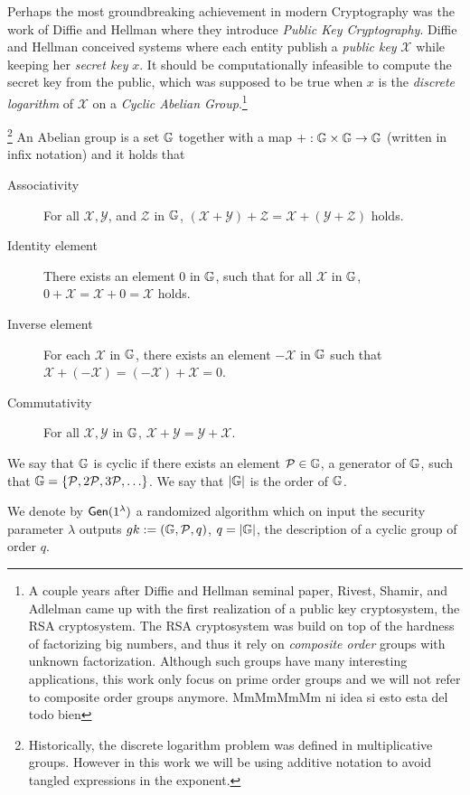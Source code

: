 Perhaps the most groundbreaking achievement in modern Cryptography was the work of Diffie and Hellman \cite{DifHel76} where they introduce \emph{Public Key Cryptography}. Diffie and Hellman conceived systems where each entity publish a \emph{public key} $\mathcal{X}$ while keeping her \emph{secret key} $x$.  It should be computationally infeasible to compute the secret key from the public, which was supposed to be true when $x$ is the \emph{discrete logarithm} of $\mathcal{X}$ on a \emph{Cyclic Abelian Group}.\footnote{A couple years after Diffie and Hellman seminal paper,  Rivest, Shamir, and Adlelman came up with the first realization of a public key cryptosystem, the RSA cryptosystem. The RSA cryptosystem was build on top of the hardness of factorizing big numbers, and thus it rely on \emph{composite order} groups with unknown factorization. Although such groups have many interesting applications, this work only focus on prime order groups and we will not refer to composite order groups anymore.{\color{red} MmMmMmMm ni idea si esto esta del todo bien}}
\begin{definition}\footnote{Historically, the discrete logarithm problem was defined in multiplicative groups. However in this work we will be using additive notation to avoid tangled expressions in the exponent.} 
An Abelian group is a set $\mathbb{G}$ together with a map $+:\mathbb{G}\times\mathbb{G}\to\mathbb{G}$ (written in infix notation) and  it holds that
\begin{description}
\item[Associativity]
For all $\mathcal{X}, \mathcal{Y}$, and $\mathcal{Z}$ in $\mathbb{G}$, $(\mathcal{X} + \mathcal{Y}) + \mathcal{Z}= \mathcal{X} + (\mathcal{Y} + \mathcal{Z})$ holds.
\item[Identity element]
There exists an element $0$ in $\mathbb{G}$, such that for all $\mathcal{X}$ in $\mathbb{G}$, $0 + \mathcal{X} = \mathcal{X} + 0 = \mathcal{X}$ holds.
\item[Inverse element]
For each $\mathcal{X}$ in $\mathbb{G}$, there exists an element $-\mathcal{X}$ in $\mathbb{G}$ such that $\mathcal{X}+ (-\mathcal{X}) = (-\mathcal{X}) +\mathcal{X} = 0$.
\item[Commutativity]
For all $\mathcal{X}, \mathcal{Y}$ in $\mathbb{G}$, $\mathcal{X} + \mathcal{Y}=\mathcal{Y}+\mathcal{X}$.
\end{description}
We say that $\mathbb{G}$ is cyclic if there exists an element $\mathcal{P}\in\mathbb{G}$, a generator of $\mathbb{G}$, such that $\mathbb{G}=\{\mathcal{P}, 2\mathcal{P}, 3\mathcal{P},\ldots\}$. We say that $|\mathbb{G}|$ is the order of $\mathbb{G}$.

We denote by $\mathsf{Gen}(1^\lambda)$ a randomized algorithm which on input the security parameter $\lambda$ outputs $gk:=(\mathbb{G},\mathcal{P},q)$, $q=|\mathbb{G}|$, the description of a cyclic group of order $q$.
\end{definition}

